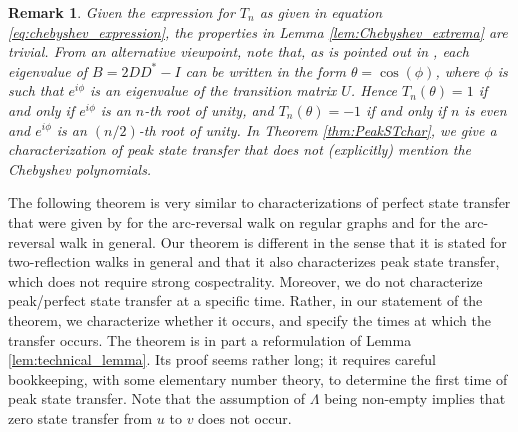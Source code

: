 \documentclass{article}
\newtheorem{remark}[theorem]{Remark}
\numberwithin{equation}{section}
\begin{document}
\begin{remark}
Given the expression for $T_n$ as given in equation \eqref{eq:chebyshev_expression}, the properties in Lemma \ref{lem:Chebyshev_extrema} are trivial. From an alternative viewpoint, note that, as is pointed out in \cite{Zha2021}, each eigenvalue of $B = 2DD^* - I$ can be written in the form $\theta = \cos(\phi)$, where $\phi$ is such that $e^{i\phi}$ is an eigenvalue of the transition matrix $U$. Hence $T_{n}(\theta) = 1$ if and only if $e^{i\phi}$ is an $n$-th root of unity, and $T_{n}(\theta) = -1$ if and only if $n$ is even and $e^{i\phi}$ is an $(n/2)$-th root of unity. In Theorem \ref{thm:PeakSTchar}, we give a characterization of peak state transfer that does not (explicitly) mention the Chebyshev polynomials.
\end{remark}
The following theorem is very similar to characterizations of perfect state transfer that were given by \cite[Theorem 5.3]{Zha2019} for the arc-reversal walk on regular graphs and \cite[Theorem 6.5]{KubYos2024}
for the arc-reversal walk in general. Our theorem is different in the sense that it is stated for two-reflection walks in general and that it also characterizes peak state transfer, which does not require strong cospectrality. Moreover, we do not characterize peak/perfect state transfer at a specific time. Rather, in our statement of the theorem, we characterize whether it occurs, and specify the times at which the transfer occurs. The theorem is in part a reformulation of Lemma \ref{lem:technical_lemma}. Its proof seems rather long; it requires careful bookkeeping, with some elementary number theory, to determine the first time of peak state transfer. Note that the assumption of $\Lambda$ being non-empty implies that zero state transfer from $u$ to $v$ does not occur.
\end{document}
